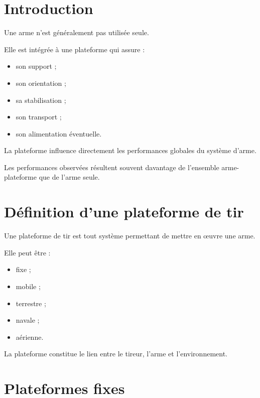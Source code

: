 
\section{Introduction}

Une arme n'est généralement pas utilisée seule.

Elle est intégrée à une plateforme qui assure :

\begin{itemize}
    \item son support ;
    \item son orientation ;
    \item sa stabilisation ;
    \item son transport ;
    \item son alimentation éventuelle.
\end{itemize}

La plateforme influence directement les performances globales du système
d'arme.

\begin{aretenir}

Les performances observées résultent souvent davantage de l'ensemble
arme-plateforme que de l'arme seule.

\end{aretenir}

\section{Définition d'une plateforme de tir}

Une plateforme de tir est tout système permettant de mettre en œuvre une
arme.

Elle peut être :

\begin{itemize}
    \item fixe ;
    \item mobile ;
    \item terrestre ;
    \item navale ;
    \item aérienne.
\end{itemize}

La plateforme constitue le lien entre le tireur, l'arme et l'environnement.

\section{Plateformes fixes}

